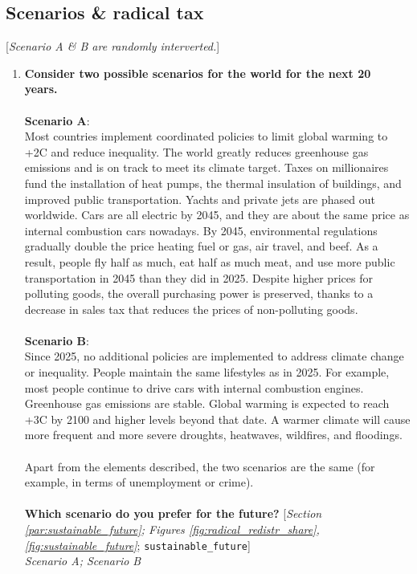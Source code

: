  \subsection*{Scenarios \& radical tax} 
 [\textit{Scenario A \& B are randomly interverted.}]
 \begin{enumerate}[resume] 
\item  \label{q:sustainable_future} \textbf{Consider two possible scenarios for the world for the next 20 years.~\\\\Scenario A}: \\Most countries implement coordinated policies to limit global warming to +2\textdegree{}C and reduce inequality. The world greatly reduces greenhouse gas emissions and is on track to meet its climate target. Taxes on millionaires fund the installation of heat pumps, the thermal insulation of buildings, and improved public transportation. Yachts and private jets are phased out worldwide. Cars are all electric by 2045, and they are about the same price as internal combustion cars nowadays. By 2045, environmental regulations gradually double the price heating fuel or gas, air travel, and beef. As a result, people fly half as much, eat half as much meat, and use more public transportation in 2045 than they did in 2025. Despite higher prices for polluting goods, the overall purchasing power is preserved, thanks to a decrease in sales tax that reduces the prices of non-polluting goods.\\\\\textbf{Scenario B}:\\Since 2025, no additional policies are implemented to address climate change or inequality. People maintain the same lifestyles as in 2025. For example, most people continue to drive cars with internal combustion engines. Greenhouse gas emissions are stable. Global warming is expected to reach +3\textdegree{}C by 2100 and higher levels beyond that date. A warmer climate will cause more frequent and more severe droughts, heatwaves, wildfires, and floodings.\\\\Apart from the elements described, the two scenarios are the same (for example, in terms of unemployment or crime). \\\\\textbf{Which scenario do you prefer for the future?} [\textit{Section \ref{par:sustainable_future}; Figures \ref{fig:radical_redistr_share}, \ref{fig:sustainable_future}}; 
\verb|sustainable_future|]
  \\ \textit{Scenario A; Scenario B} \\\\

\end{enumerate}
